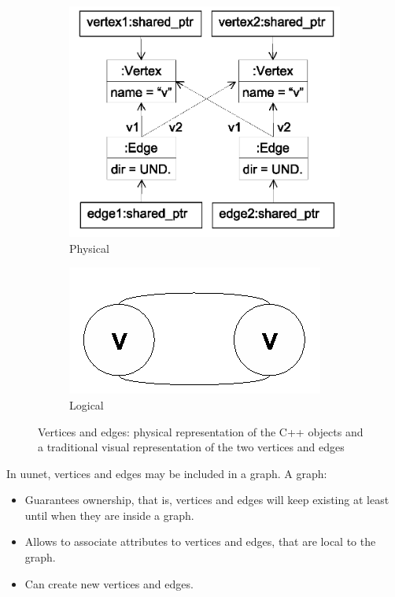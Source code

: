 \begin{figure}
  \centering
\begin{subfigure}{.7\textwidth}
  \centering
  \includegraphics[width=.8\linewidth]{figs/vertices_edges_cpp.eps}
  \caption{Physical}
  \label{fig:vertices_edges-physical}
\end{subfigure}
\begin{subfigure}{.2\textwidth}
  \centering
  \includegraphics[width=.8\linewidth]{figs/vertices_edges_logical.eps}
  \caption{Logical}
  \label{fig:vertices_edges_logical}
\end{subfigure}
\caption{Vertices and edges: physical representation of the C++ objects and a traditional visual representation of the two vertices and edges}
\label{fig:vertices_edges}
\end{figure}

In uunet, vertices and edges may be included in a graph. A graph:
\begin{itemize}
    \item Guarantees ownership, that is, vertices and edges will keep existing at least until when they are inside a graph.
    \item Allows to associate attributes to vertices and edges, that are local to the graph.
    \item Can create new vertices and edges.
\end{itemize}

